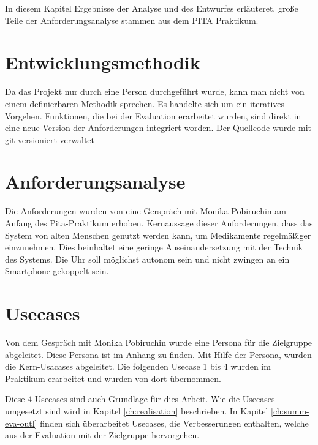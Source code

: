 In diesem Kapitel Ergebnisse der Analyse und des Entwurfes erläuteret. große Teile der Anforderungsanalyse stammen aus dem PITA Praktikum.
\section{Entwicklungsmethodik}
Da das Projekt nur durch eine Person durchgeführt wurde, kann man nicht von einem definierbaren Methodik sprechen. Es handelte sich um ein iteratives Vorgehen. Funktionen, die bei der Evaluation erarbeitet wurden, sind direkt in eine neue Version der Anforderungen integriert worden. Der Quellcode wurde mit \gls{git} versioniert verwaltet
\section{Anforderungsanalyse}
Die Anforderungen wurden von eine Gerspräch mit Monika Pobiruchin am Anfang des Pita-Praktikum erhoben. Kernaussage dieser Anforderungen, dass das System von alten Menschen genutzt werden kann, um Medikamente regelmäßiger einzunehmen. Dies beinhaltet eine geringe Auseinandersetzung mit der Technik des Systems. Die Uhr soll möglichst autonom sein und nicht zwingen an ein Smartphone gekoppelt sein.

\section{Usecases} 
Von dem Gespräch mit Monika Pobiruchin wurde eine Persona für die Zielgruppe abgeleitet. Diese Persona ist im Anhang zu finden.
Mit Hilfe der Persona, wurden die Kern-Usacases abgeleitet. Die folgenden Usecase 1 bis 4 wurden im Praktikum erarbeitet und wurden von dort übernommen. 

Diese 4 Usecases sind auch Grundlage für dies Arbeit. Wie die Usecases umgesetzt sind wird in Kapitel \ref{ch:realisation} beschrieben. In Kapitel \ref{ch:summ-eva-outl} finden sich überarbeitet Usecases, die Verbesserungen enthalten, welche aus der Evaluation mit der Zielgruppe hervorgehen.

